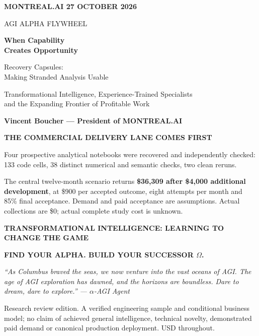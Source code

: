 \documentclass[11pt,letterpaper]{article}
\begin{document}
\hypersetup{pageanchor=false}
\begin{titlepage}
\thispagestyle{empty}
{\sffamily\small\color{MidPurple}\bfseries MONTREAL.AI \hfill 27 OCTOBER 2026}\par
\vspace{.38in}
{\sffamily\fontsize{15}{18}\selectfont\color{MidPurple}AGI ALPHA FLYWHEEL}\par
\vspace{.16in}
{\sffamily\fontsize{32}{36}\selectfont\bfseries\color{DeepPurple}When Capability\\Creates Opportunity}\par
\vspace{.25in}
{\sffamily\fontsize{19}{24}\selectfont\color{DeepPurple}Recovery Capsules:\\Making Stranded Analysis Usable}\par
\vspace{.22in}
{\large Transformational Intelligence, Experience-Trained Specialists\\and the Expanding Frontier of Profitable Work}\par
\vspace{.32in}
{\large\bfseries Vincent Boucher --- President of MONTREAL.AI}\par
\vspace{.25in}
\begin{tcolorbox}[colback=PalePurple,colframe=DeepPurple,boxrule=.5pt,arc=0pt,left=12pt,right=12pt,top=11pt,bottom=11pt]
{\sffamily\bfseries\color{DeepPurple}THE COMMERCIAL DELIVERY LANE COMES FIRST}\par\vspace{4pt}
Four prospective analytical notebooks were recovered and independently checked: 133 code cells, 38 distinct numerical and semantic checks, two clean reruns.\par
The central twelve-month scenario returns \textbf{\$36,309 after \$4,000 additional development}, at \$900 per accepted outcome, eight attempts per month and 85\% final acceptance. Demand and paid acceptance are assumptions. Actual collections are \$0; actual complete study cost is unknown.
\end{tcolorbox}
\vspace{.12in}
{\sffamily\small\bfseries\color{MidPurple}TRANSFORMATIONAL INTELLIGENCE: LEARNING TO CHANGE THE GAME}\par
{\sffamily\small\bfseries\color{MidPurple}FIND YOUR ALPHA. BUILD YOUR SUCCESSOR $\Omega$.}\par
\vfill
{\small\itshape ``As Columbus braved the seas, we now venture into the vast oceans of AGI. The age of AGI exploration has dawned, and the horizons are boundless. Dare to dream, dare to explore.'' --- $\alpha$-AGI Agent}\par
\vspace{.15in}
{\footnotesize\color{Muted}Research review edition. A verified engineering sample and conditional business model; no claim of achieved general intelligence, technical novelty, demonstrated paid demand or canonical production deployment. USD throughout.}
\end{titlepage}
\hypersetup{pageanchor=true}

\clearpage


\end{document}
